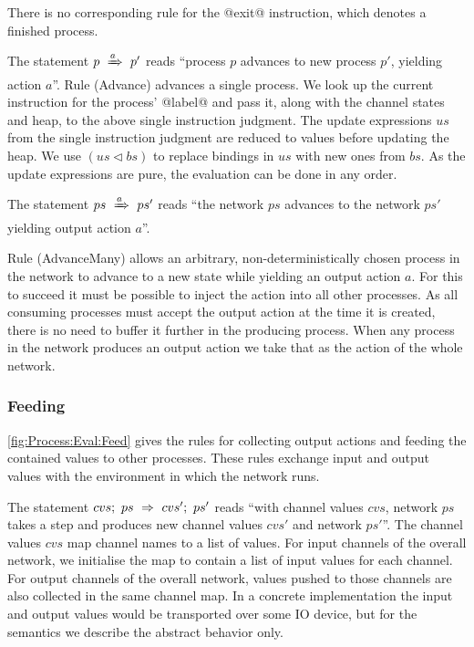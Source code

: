 There is no corresponding rule for the @exit@ instruction, which denotes a finished process.

The statement $p~\xRightarrow{a}~p'$ reads ``process $p$ advances to new process $p'$, yielding action $a$''. Rule (Advance) advances a single process. We look up the current instruction for the process' @label@ and pass it, along with the channel states and heap, to the above single instruction judgment. The update expressions $us$ from the single instruction judgment are reduced to values before updating the heap. We use $(us \lhd bs)$ to replace bindings in $us$ with new ones from $bs$. As the update expressions are pure, the evaluation can be done in any order.

The statement $ps~\xRightarrow{a}~ps'$ reads ``the network $ps$ advances to the network $ps'$ yielding output action $a$''.

Rule (AdvanceMany) allows an arbitrary, non-deterministically chosen process in the network to advance to a new state while yielding an output action $a$.
For this to succeed it must be possible to inject the action into all other processes.
As all consuming processes must accept the output action at the time it is created, there is no need to buffer it further in the producing process.
When any process in the network produces an output action we take that as the action of the whole network.



\subsubsection{Feeding}
\autoref{fig:Process:Eval:Feed} gives the rules for collecting output actions and feeding the contained values to other processes.
These rules exchange input and output values with the environment in which the network runs.

The statement $cvs;~ps~\Rightarrow~cvs';~ps'$ reads ``with channel values $cvs$, network $ps$ takes a step and produces new channel values $cvs'$ and network $ps'$''.
The channel values $cvs$ map channel names to a list of values.
For input channels of the overall network, we initialise the map to contain a list of input values for each channel.
For output channels of the overall network, values pushed to those channels are also collected in the same channel map.
In a concrete implementation the input and output values would be transported over some IO device, but for the semantics we describe the abstract behavior only.

